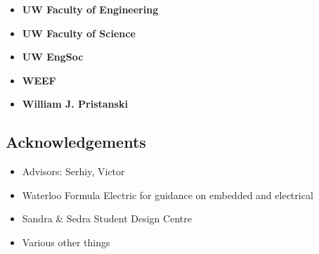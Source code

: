 \documentclass[main.tex]{subfiles}
\begin{document}
\begin{multicols}{3}
\begin{itemize}[label={},noitemsep]
    \item \textbf{UW Faculty of Engineering}
    \end{itemize}
    \columnbreak
    \begin{itemize}[label={},noitemsep]
    \item \textbf{UW Faculty of Science}
    \end{itemize}
    \columnbreak
    \begin{itemize}[label={},noitemsep]
    \item \textbf{UW EngSoc}
    \end{itemize}
    \columnbreak
\end{multicols}

\begin{multicols}{2}
\begin{itemize}[label={},noitemsep]
    \item \textbf{WEEF}
    \end{itemize}
    \columnbreak
    \begin{itemize}[label={},noitemsep]
    \item \textbf{William J. Pristanski}
    \end{itemize}
    \columnbreak
\end{multicols}

\subsection{Acknowledgements}

\begin{itemize}
    \item Advisors: Serhiy, Victor
    \item Waterloo Formula Electric for guidance on embedded and electrical
    \item Sandra \& Sedra Student Design Centre
    \item Various other things
\end{itemize}
\end{document}
